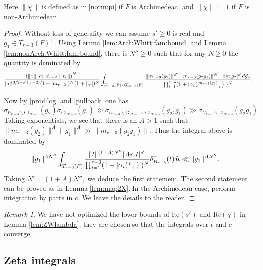 \documentclass[12pt]{amsart}
\theoremstyle{remark}
\newtheorem*{rem}{Remark}
\numberwithin{equation}{section}
\newcommand{\GL}{\mathrm{GL}}
\theoremstyle{definition}
\newenvironment{psmatrix}
  {\left(\begin{smallmatrix}}
  {\end{smallmatrix}\right)}
\numberwithin{equation}{subsection}
\newcommand{\norm}[1]{\lVert#1\rVert}
\begin{document}
Here $\norm{\chi}$ is defined as in \eqref{norm:pi} if $F$ is Archimedean, and $\norm{\chi}:=1$ if $F$ is non-Archimedean.
\begin{proof}
   Without loss of generality we can assume  $s'\ge 0$ is real and $g_1\in T_{r-3}(F)^+$. Using Lemma \ref{lem:Arch:Whitt:fam:bound} and Lemma \ref{lem:nonArch:Whitt:fam:bound}, there is $N''\ge 0$ such that for any $N\ge 0$ the quantity is dominated by
    \begin{align*}
    \frac{\left(\norm{z}\norm{a}\norm{t_{r-2}}\norm{t_r}\right)^{N''}}{|a|^{(3/2-s')(r-2)}(1+|at_{r-2}|)^N(1+|t_r|)^N}
   \int_{U_{r-3}(F) \backslash \GL_{r-3}(F)}\frac{\norm{m_{r-3}(g_2)}^{N''}\norm{m_{r-3}(g_2g_1)}^{N''}|\det g_2|^{s'} d\dot{g_2}}
{\prod_{i=1}^{r-3}(1+|\alpha_i\begin{psmatrix} m_{r-3}(g_2) & \\ & 1 \end{psmatrix}|)^N}.
\end{align*}

Now by \eqref{prod:log} and \eqref{pullback} one has 
$$
\sigma_{U_{r-3} \backslash \GL_{r-3}}(g_2)\sigma_{\GL_{r-3}}(g_1)\gg\sigma_{U_{r-3}\backslash \GL_{r-3} \times \GL_{r-3}}(g_2,g_1)  \gg  \sigma_{U_{r-3} \backslash \GL_{r-3}}(g_2g_1) .
$$
Taking exponentials, we see that there is an $A>1$ such that $\norm{m_{r-3}(g_2)}^A\norm{g_1}^A \gg \norm{m_{r-3}(g_2g_1)}.$  Thus the integral above is dominated by
 \begin{align*} 
   & \norm{g_1}^{AN''}\int_{T_{r-3}(F)}\frac{\norm{t}^{(1+A)N''}|\det t|^{s'}}
{\prod_{i=1}^{r-3}(1+|\alpha_i\begin{psmatrix} t & \\ & 1 \end{psmatrix}|)^{N}}\delta_{B_{r-3}}^{-1}(t)dt \ll \norm{g_1}^{AN''}.
\end{align*}
Taking $N'=(1+A)N'',$ we deduce the first statement.
The second statement can be proved as in Lemma \ref{lem:map2X}. In the Archimedean case, perform integration by parts in $c.$ We leave the details to the reader.
\end{proof}




\begin{rem} We have not optimized the lower bounds of $\mathrm{Re}(s')$ and $\mathrm{Re}(\chi)$ in Lemma \ref{lem:ZWlambda}; they are chosen so that the integrals over $t$ and $c$ converge.   
\end{rem}


\subsection{Zeta integrals}
\end{document}
